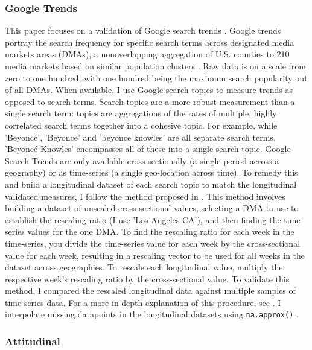 \subsubsection{Google Trends}
This paper focuses on a validation of Google search trends \citep{googletrends}.
Google trends portray the search frequency for specific search terms across
designated media markets areas (DMAs), a nonoverlapping aggregation of U.S.
counties to 210 media markets based on similar population clusters \citep{dma_key}.
Raw data is on a scale from zero to one hundred, with one hundred being the maximum search
popularity out of all DMAs. When available, I use Google search topics to
measure trends as opposed to search terms. Search topics are a more robust
measurement than a single search term: topics are aggregations of the rates of
multiple, highly correlated search terms together into a cohesive topic. For
example, while 'Beyoncé', 'Beyonce' and 'beyonce knowles' are all separate
search terms, 'Beyoncé Knowles' encompasses all of these into a single search
topic. Google Search Trends are only available cross-sectionally (a single 
period across a geography) or as time-series (a single geo-location across
time). To remedy this and build a longitudinal dataset of each search topic 
to match the longitudinal validated measures, I follow the method proposed in \citet[p. 5]{park_etal}.
This method involves building a dataset of unscaled cross-sectional values,
selecting a DMA to use to establish the rescaling ratio (I use 'Los Angeles
CA'), and then finding the time-series values for the one DMA. To find the
rescaling ratio for each week in the time-series, you divide the time-series
value for each week by the cross-sectional value for each week, resulting in a
rescaling vector to be used for all weeks in the dataset across geographies. To
rescale each longitudinal value, multiply the respective week's rescaling ratio
by the cross-sectional value. To validate this method, I compared the rescaled
longitudinal data against multiple samples of time-series data. For a more
in-depth explanation of this procedure, see \citet[p. 5]{park_etal}. I interpolate 
missing datapoints in the longitudinal datasets using \texttt{na.approx()} \citep{zoo}.

\subsubsection{Attitudinal}


